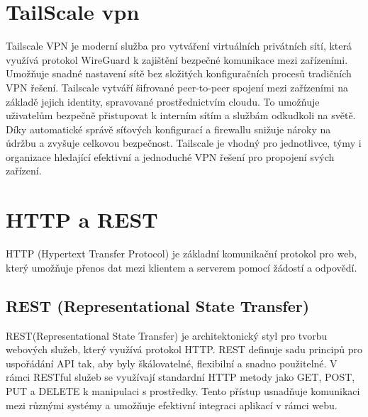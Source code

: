 \section{TailScale vpn}\label{sec:tailscale}
Tailscale VPN je moderní služba pro vytváření virtuálních privátních sítí, která využívá protokol WireGuard k zajištění bezpečné komunikace mezi zařízeními. Umožňuje snadné nastavení sítě bez složitých konfiguračních procesů tradičních VPN řešení. Tailscale vytváří šifrované peer-to-peer spojení mezi zařízeními na základě jejich identity, spravované prostřednictvím cloudu. To umožňuje uživatelům bezpečně přistupovat k interním sítím a službám odkudkoli na světě. Díky automatické správě síťových konfigurací a firewallu snižuje nároky na údržbu a zvyšuje celkovou bezpečnost. Tailscale je vhodný pro jednotlivce, týmy i organizace hledající efektivní a jednoduché VPN řešení pro propojení svých zařízení.


\section{HTTP a REST}\label{sec:http-rest}
HTTP (Hypertext Transfer Protocol) je základní komunikační protokol pro web, který umožňuje přenos dat mezi klientem a serverem pomocí žádostí a odpovědí.

\subsection{REST (Representational State Transfer)}
REST(Representational State Transfer) je architektonický styl pro tvorbu webových služeb, který využívá protokol HTTP. REST definuje sadu principů pro uspořádání API tak, aby byly škálovatelné, flexibilní a snadno použitelné. V rámci RESTful služeb se využívají standardní HTTP metody jako GET, POST, PUT a DELETE k manipulaci s prostředky. Tento přístup usnadňuje komunikaci mezi různými systémy a umožňuje efektivní integraci aplikací v rámci webu.
